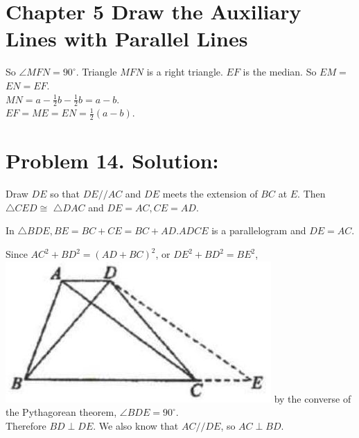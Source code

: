 \documentclass[10pt]{article}
\begin{document}
\section*{Chapter 5 Draw the Auxiliary Lines with Parallel Lines}
So \(\angle M F N=90^{\circ}\). Triangle \(M F N\) is a right triangle. \(E F\) is the median. So \(E M=\) \(E N=E F\).\\
\(M N=a-\frac{1}{2} b-\frac{1}{2} b=a-b\).\\
\(E F=M E=E N=\frac{1}{2}(a-b)\).

\section*{Problem 14. Solution:}
Draw \(D E\) so that \(D E / / A C\) and \(D E\) meets the extension of \(B C\) at \(E\). Then \(\triangle C E D \cong\) \(\triangle D A C\) and \(D E=A C, C E=A D\).

In \(\triangle B D E, B E=B C+C E=B C+A D . A D C E\) is a parallelogram and \(D E=A C\).

Since \(A C^{2}+B D^{2}=(A D+B C)^{2}\), or \(D E^{2}+B D^{2}=B E^{2}\),\\
\includegraphics[max width=\textwidth]{2025_04_17_97bc1f7e44d93c271a88g-138(1)} by the converse of the Pythagorean theorem, \(\angle B D E=90^{\circ}\).\\
Therefore \(B D \perp D E\). We also know that \(A C / / D E\), so \(A C \perp B D\).
\end{document}
